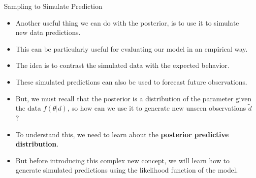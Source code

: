 \documentclass[handout]{beamer}
\begin{document}
\begin{frame}{Sampling to Simulate Prediction}
\scriptsize{

\begin{itemize}
\item Another useful thing we can do with the posterior, is to use it to simulate new data predictions.

\item This can be particularly useful for evaluating our model in an empirical way.

\item The idea is to contrast the simulated data with the expected behavior.

\item These simulated predictions can also be used to forecast future observations.

\item But, we must recall that the posterior is a distribution of the parameter given the data $f(\theta|d)$, so how can we use it to generate new unseen observations $\tilde{d}$?

\item To understand this, we need to learn about the \textbf{posterior predictive distribution}.

\item But before introducing this complex new concept, we will learn how to generate simulated predictions using  the likelihood function of the model.

\end{itemize}


} 
\end{frame}
\end{document}
